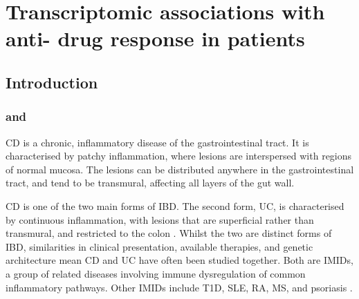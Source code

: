 %
%

\chapter{Transcriptomic associations with anti- drug response in  patients}
\label{ch:multiPANTS}


\section{Introduction}

\subsection{ and }

\gls{CD} is a chronic, inflammatory disease of the gastrointestinal tract.
It is characterised by patchy inflammation, where lesions are interspersed with regions of normal mucosa. 
The lesions can be distributed anywhere in the gastrointestinal tract, and tend to be transmural, affecting all layers of the gut wall.

\gls{CD} is one of the two main forms of \gls{IBD}.
The second form, \gls{UC}, is characterised by continuous inflammation, with lesions that are superficial rather than transmural, and restricted to the colon \autocite{roda2020CrohnDisease}.
Whilst the two are distinct forms of \gls{IBD}, similarities in clinical presentation, available therapies, and genetic architecture mean \gls{CD} and \gls{UC} have often been studied together.
Both are \glspl{IMID}, a group of related diseases involving immune dysregulation of common inflammatory pathways.
Other \glspl{IMID} include \gls{T1D}, \gls{SLE}, \gls{RA}, \gls{MS}, and psoriasis \autocite{cotsapas2013ImmunemediatedDiseaseGenetics,david2018GeneticsImmunemediatedInflammatory}.

